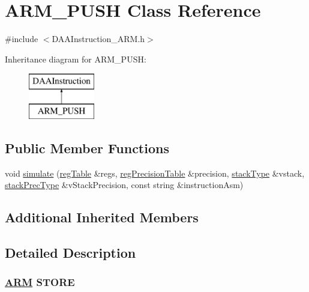 \hypertarget{classARM__PUSH}{}\section{A\+R\+M\+\_\+\+P\+U\+SH Class Reference}
\label{classARM__PUSH}


{\ttfamily \#include $<$D\+A\+A\+Instruction\+\_\+\+A\+R\+M.\+h$>$}

Inheritance diagram for A\+R\+M\+\_\+\+P\+U\+SH\+:\begin{figure}[H]
\begin{center}
\leavevmode
\includegraphics[height=2.000000cm]{classARM__PUSH}
\end{center}
\end{figure}
\subsection*{Public Member Functions}
\begin{DoxyCompactItemize}
\item 
void \hyperlink{classARM__PUSH_ad2d67e12753861f52a0ee63f55239ca1}{simulate} (\hyperlink{DAAInstruction_8h_af0fae93a861de9cf37988d5673cac523}{reg\+Table} \&regs, \hyperlink{DAAInstruction_8h_a0e8cae02815a5f8adc750122d790b455}{reg\+Precision\+Table} \&precision, \hyperlink{DAAInstruction_8h_a1b0e70ac1a04f06c8132055ed01f589f}{stack\+Type} \&vstack, \hyperlink{DAAInstruction_8h_ac5cb793e9dac3fa9693da78b7e29ab30}{stack\+Prec\+Type} \&v\+Stack\+Precision, const string \&instruction\+Asm)
\end{DoxyCompactItemize}
\subsection*{Additional Inherited Members}


\subsection{Detailed Description}


 \subsubsection*{\hyperlink{classARM}{A\+RM} S\+T\+O\+RE }

